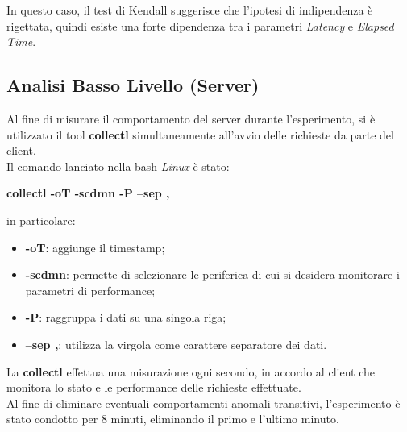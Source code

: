 In questo caso, il test di Kendall suggerisce che l'ipotesi di indipendenza è
rigettata, quindi esiste una forte dipendenza tra i parametri \textit{Latency} e
\textit{Elapsed Time}.

\subsection{Analisi Basso Livello (Server)}
Al fine di misurare il comportamento del server durante l'esperimento, si è
utilizzato il tool \textbf{collectl} simultaneamente all'avvio delle richieste
da parte del client.\\
Il comando lanciato nella bash \textit{Linux} è stato:\\
\begin{center}
  \textbf{collectl -oT -scdmn -P --sep ,}
\end{center}
in particolare:

\begin{itemize}
  \item \textbf{-oT}: aggiunge il timestamp;
  \item \textbf{-scdmn}:  permette di selezionare le periferica di cui si desidera
   monitorare i parametri di performance;
  \item \textbf{-P}: raggruppa i dati su una singola riga;
  \item \textbf{--sep ,}: utilizza la virgola come carattere separatore dei dati.
\end{itemize}

La \textbf{collectl} effettua una misurazione ogni secondo, in accordo al client
che monitora lo stato e le performance delle richieste effettuate.\\
Al fine di eliminare eventuali comportamenti anomali transitivi, l'esperimento è
stato condotto per 8 minuti, eliminando il primo e l'ultimo minuto.\\

